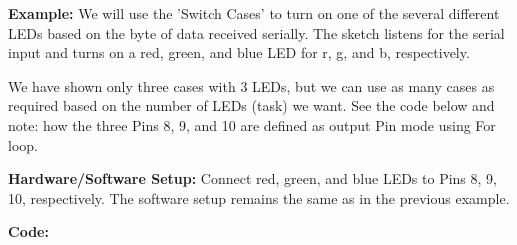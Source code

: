 \documentclass[12pt,a4paper]{article}
\begin{document}
\setlength{\parindent}{0eM}
\begin{justify}
\textbf{Example: }We will use the 'Switch Cases' to turn on one of the several different LEDs based on the byte of data received serially. The sketch listens for the serial input and turns on a red, green, and blue LED for r, g, and b, respectively.\par
\noindent We have shown only three cases with 3 LEDs, but we can use as many cases as required based on the number of LEDs (task) we want. See the code below and note: how the three Pins 8, 9, and 10 are defined as output Pin mode using For loop.\par
\noindent \textbf{Hardware/Software Setup:} Connect red, green, and blue LEDs to Pins 8, 9, 10, respectively. The software setup remains the same as in the previous example.  \end{justify}

\vspace{-3mm}

\hspace{1.5cm}\textbf{\large Code:}\\[6pt]
\setlength{\parindent}{8eM}
\end{document}
